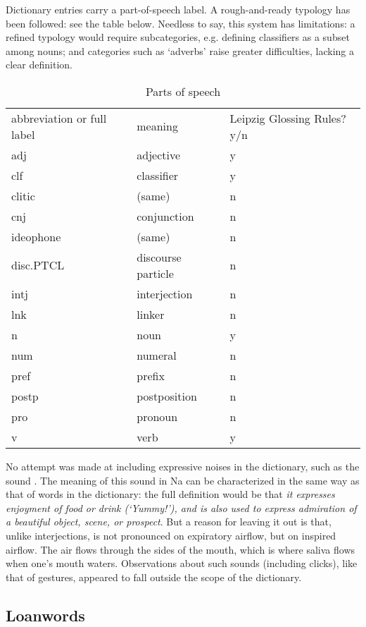 Dictionary entries carry a part-of-speech label. A rough-and-ready typology has been followed: see the table below. Needless to say, this system has limitations: a refined typology would require subcategories, e.g. defining classifiers as a subset among nouns; and categories such as ‘adverbs' raise greater difficulties, lacking a clear definition.
\begin{table}
	\caption{Parts of speech}
	\begin{tabular}{lll}
		abbreviation or full label & meaning & Leipzig Glossing Rules? y/n \\
		adj & adjective & y \\
		clf & classifier & y \\
		clitic & (same) & n \\
		cnj & conjunction & n \\
		ideophone & (same) & n \\
		disc.PTCL & discourse particle & n \\
		intj & interjection & n \\
		lnk & linker & n \\
		n & noun & y \\
		num & numeral & n \\
		pref & prefix & n \\
		postp & postposition & n \\
		pro & pronoun & n \\
		v & verb & y \\
	\end{tabular}
\end{table}

No attempt was made at including expressive noises in the dictionary, such as the sound . The meaning of this sound in Na can be characterized in the same way as that of words in the dictionary: the full definition would be that  \textit{it expresses enjoyment of food or drink (‘Yummy!'), and is also used to express admiration of a beautiful object, scene, or prospect}. But a reason for leaving it out is that, unlike interjections,   is not pronounced on expiratory airflow, but on inspired airflow. The air flows through the sides of the mouth, which is where saliva flows when one's mouth waters. Observations about such sounds (including clicks), like that of gestures, appeared to fall outside the scope of the dictionary.

	\subsection{Loanwords} \label{sec:loan}

